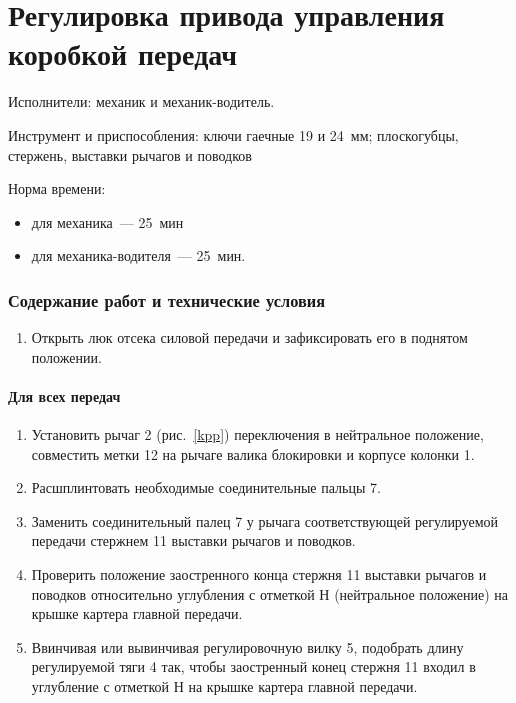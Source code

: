 \section{Регулировка привода управления коробкой передач}
Исполнители: механик и механик-водитель. 

Инструмент и приспособления: ключи гаечные 19 и 24~мм; плоскогубцы, стержень, выставки рычагов и поводков 

Норма времени: 
\begin{itemize}
    \item для механика~--- 25~мин
    \item для механика-водителя~--- 25~мин. 
\end{itemize}

\subsubsection{Содержание работ и технические условия}
\begin{enumerate}
    \item Открыть люк отсека силовой передачи и зафиксировать его в поднятом положении. 
\end{enumerate}

\paragraph{Для всех передач}
\begin{enumerate}
\item Установить рычаг 2 (рис.~\ref{kpp}) переключения в нейтральное положение, совместить метки 12 на рычаге валика блокировки и корпусе колонки 1. 
\item Расшплинтовать необходимые соединительные пальцы 7. 
\item Заменить соединительный палец 7 у рычага соответствующей регулируемой передачи стержнем 11 выставки рычагов и поводков. 
\item Проверить положение заостренного конца стержня 11 выставки рычагов и поводков относительно углубления с отметкой Н (нейтральное положение) на крышке картера главной передачи. 
\item Ввинчивая или вывинчивая регулировочную вилку 5, подобрать длину регулируемой тяги 4 так, чтобы заостренный конец стержня 11 входил в углубление с отметкой Н на крышке картера главной передачи.
\end{enumerate}

    
